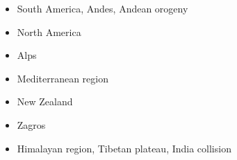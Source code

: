 \begin{itemize}
\item South America, Andes, Andean orogeny 
{\scriptsize
\cite{wdbo94b}
\cite{gusb00}
\cite{vavv02b}
\cite{baso05}\cite{soba05}
\cite{basv06}
\cite{hucf12}\cite{shlm12}
\cite{cudd15}
\cite{robn16}
\cite{sche17}
\cite{yamg19}
}
\item North America 
{\scriptsize
\cite{huha90}
\cite{bugm97}
\cite{besb06}
\cite{splg08}
\cite{splg09}
\cite{ghbh13}\cite{simi13}
}
\item Alps 
{\scriptsize
\cite{beeh96}
\cite{pfeb00}
\cite{pfsb02}
\cite{pimo03}
\cite{buge05}
\cite{vifj08}
\cite{luws13}
\cite{bubj14}
\cite{scdu15}
}
\item Mediterranean region 
{\scriptsize
\cite{pimo97}
\cite{pimo03}
\cite{bofb10}\cite{fabe10}
\cite{chsv14}\cite{chsg14}\cite{vavs14}
\cite{spcv18}
}
\item {New Zealand} 
{\scriptsize
\cite{koon90}
\cite{brbe95}
\cite{bekh96}
\cite{wabb98}
\cite{babr99}
\cite{gedh02}\cite{pybf02}
\cite{gehd03}\cite{konc03}\cite{upke03}
\cite{libi06}
\cite{pyeg10}\cite{spgs10a}
\cite{grel12}
\cite{sths13}
}
\item {Zagros} 
{\scriptsize
\cite{vech06}
\cite{hamo10}
\cite{yakm11}
\cite{nipc13}
\cite{frba14}
\cite{ghbu14}
\cite{coyc16}
\cite{rugb17}
}
\item {Himalayan region, Tibetan plateau, India collision} 


\end{itemize}
